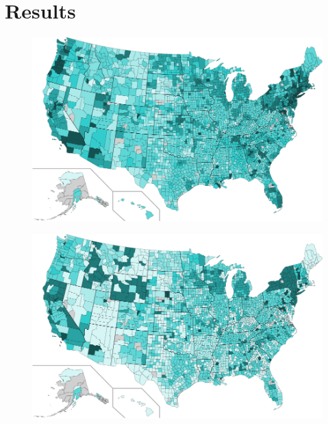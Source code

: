 \documentclass{sig-alternate-10pt}
\begin{document}
\section{Results}
\label{sec:results} 

\begin{figure}
\centering
        \includegraphics[width=0.9\linewidth]{figs/counties_maxDown.pdf}
  \caption{}
  \label{fig:services-hist}
\end{figure}

\begin{figure}
\centering
        \includegraphics[width=0.9\linewidth]{figs/counties_typDown.pdf}
  \caption{}
  \label{fig:services-hist}
\end{figure}
\end{document}
